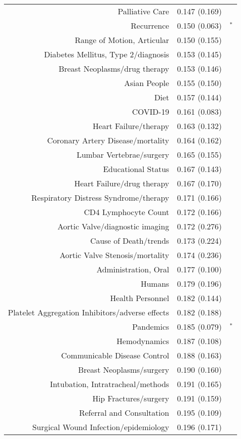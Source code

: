 \begin{longtable}[l]{rr@{}l@{ }}
Palliative Care & 0.147 (0.169) & $^{}$\\
Recurrence & 0.150 (0.063) & $^{*}$\\
Range of Motion, Articular & 0.150 (0.155) & $^{}$\\
Diabetes Mellitus, Type 2/diagnosis & 0.153 (0.145) & $^{}$\\
Breast Neoplasms/drug therapy & 0.153 (0.146) & $^{}$\\
Asian People & 0.155 (0.150) & $^{}$\\
Diet & 0.157 (0.144) & $^{}$\\
COVID-19 & 0.161 (0.083) & $^{}$\\
Heart Failure/therapy & 0.163 (0.132) & $^{}$\\
Coronary Artery Disease/mortality & 0.164 (0.162) & $^{}$\\
Lumbar Vertebrae/surgery & 0.165 (0.155) & $^{}$\\
Educational Status & 0.167 (0.143) & $^{}$\\
Heart Failure/drug therapy & 0.167 (0.170) & $^{}$\\
Respiratory Distress Syndrome/therapy & 0.171 (0.166) & $^{}$\\
CD4 Lymphocyte Count & 0.172 (0.166) & $^{}$\\
Aortic Valve/diagnostic imaging & 0.172 (0.276) & $^{}$\\
Cause of Death/trends & 0.173 (0.224) & $^{}$\\
Aortic Valve Stenosis/mortality & 0.174 (0.236) & $^{}$\\
Administration, Oral & 0.177 (0.100) & $^{}$\\
Humans & 0.179 (0.196) & $^{}$\\
Health Personnel & 0.182 (0.144) & $^{}$\\
Platelet Aggregation Inhibitors/adverse effects & 0.182 (0.188) & $^{}$\\
Pandemics & 0.185 (0.079) & $^{*}$\\
Hemodynamics & 0.187 (0.108) & $^{}$\\
Communicable Disease Control & 0.188 (0.163) & $^{}$\\
Breast Neoplasms/surgery & 0.190 (0.160) & $^{}$\\
Intubation, Intratracheal/methods & 0.191 (0.165) & $^{}$\\
Hip Fractures/surgery & 0.191 (0.159) & $^{}$\\
Referral and Consultation & 0.195 (0.109) & $^{}$\\
Surgical Wound Infection/epidemiology & 0.196 (0.171) & $^{}$\\

\end{longtable}
